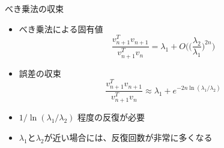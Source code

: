 \begin{frame}[t,fragile]{べき乗法の収束}
  \begin{itemize}
    \setlength{\itemsep}{1em}
  \item べき乗法による固有値
    \[
    \frac{v_{n+1}^T v_{n+1}}{v_{n+1}^T v_n} = \lambda_1 + O\Big( \big(\frac{\lambda_2}{\lambda_1} \big)^{2n}\Big)
    \]
  \item 誤差の収束
    \[
    \frac{v_{n+1}^T v_{n+1}}{v_{n+1}^T v_n} \approx \lambda_1 + e^{-2n \ln (\lambda_1/\lambda_2)}
    \]
  \item $1 / \ln (\lambda_1/\lambda_2)$ 程度の反復が必要
  \item $\lambda_1$と$\lambda_2$が近い場合には、反復回数が非常に多くなる
  \end{itemize}
\end{frame}
